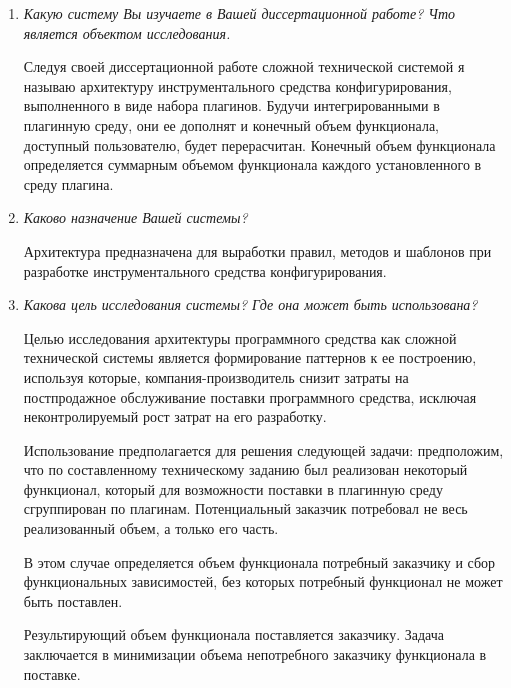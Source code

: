 \documentclass{article}
\begin{document}
    
    \thispagestyle{empty}
    \newpage

    \begin{enumerate}
        \item \textit{Какую систему Вы изучаете в Вашей диссертационной работе? Что является объектом исследования.}


        Следуя своей диссертационной работе сложной технической системой я называю архитектуру инструментального средства конфигурирования, выполненного в виде набора плагинов. Будучи интегрированными в плагинную среду, они ее дополнят и конечный объем функционала, доступный пользователю, будет перерасчитан. Конечный объем функционала определяется суммарным объемом функционала каждого установленного в среду плагина.

        \item \textit{Каково назначение Вашей системы?}

        Архитектура предназначена для выработки правил, методов и шаблонов при разработке инструментального средства конфигурирования. 


        \item \textit{Какова цель исследования системы? Где она может быть использована?}

        Целью исследования архитектуры программного средства как сложной технической системы является формирование паттернов к ее построению, используя которые, компания-производитель снизит затраты на постпродажное обслуживание поставки программного средства, исключая неконтролируемый рост затрат на его разработку.

        Использование предполагается для решения следующей задачи:
        предположим, что по составленному техническому заданию был реализован некоторый функционал, который для возможности поставки в плагинную среду сгруппирован по плагинам. Потенциальный заказчик потребовал не весь реализованный объем, а только его часть.

        В этом случае определяется объем функционала потребный заказчику и сбор функциональных зависимостей, без которых потребный функционал не может быть поставлен.

        Результирующий объем функционала поставляется заказчику. Задача заключается в минимизации объема непотребного заказчику функционала в поставке.


\end{enumerate}
\end{document}
